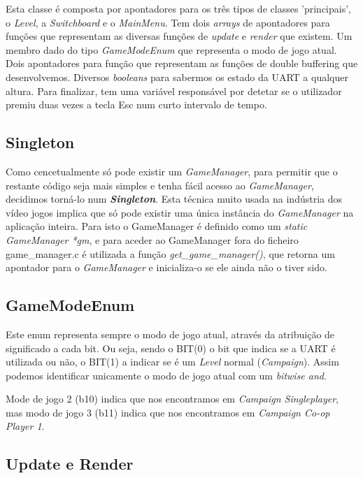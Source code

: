 \documentclass{report}
\begin{document}
Esta classe é composta por apontadores para os três tipos de classes 'principais', o \textit{Level}, a \textit{Switchboard} e o \textit{MainMenu}. Tem dois \textit{arrays} de apontadores para funções que representam as diversas funções de \textit{update} e \textit{render} que existem. Um membro dado do tipo \textit{GameModeEnum} que representa o modo de jogo atual. Dois apontadores para função que representam as funções de double buffering que desenvolvemos. Diversos \textit{booleans} para sabermos os estado da UART a qualquer altura. Para finalizar, tem uma variável responsável por detetar se o utilizador premiu duas vezes a tecla Esc num curto intervalo de tempo.

\subsection{Singleton}

Como cencetualmente só pode existir um \textit{GameManager}, para permitir que o restante código seja mais simples e tenha fácil acesso ao \textit{GameManager}, decidimos torná-lo num \textbf{\textit{Singleton}}. Esta técnica muito usada na indústria dos vídeo jogos implica que só pode existir uma única instância do \textit{GameManager} na aplicação inteira. Para isto o GameManager é definido como um \textit{static GameManager *gm}, e para aceder ao GameManager fora do ficheiro game\_manager.c é utilizada a função \textit{get\_game\_manager()}, que retorna um apontador para o \textit{GameManager} e inicializa-o se ele ainda não o tiver sido.

\subsection{GameModeEnum}

Este enum representa sempre o modo de jogo atual, através da atribuição de significado a cada bit. Ou seja, sendo o BIT(0) o bit que indica se a UART é utilizada ou não, o BIT(1) a indicar se é um \textit{Level} normal (\textit{Campaign}). Assim podemos identificar unicamente o modo de jogo atual com um \textit{bitwise and}.

Mode de jogo 2 (b10) indica que nos encontramos em \textit{Campaign Singleplayer}, mas modo de jogo 3 (b11) indica que nos encontramos em \textit{Campaign Co-op Player 1}.

\subsection{Update e Render}
\end{document}

